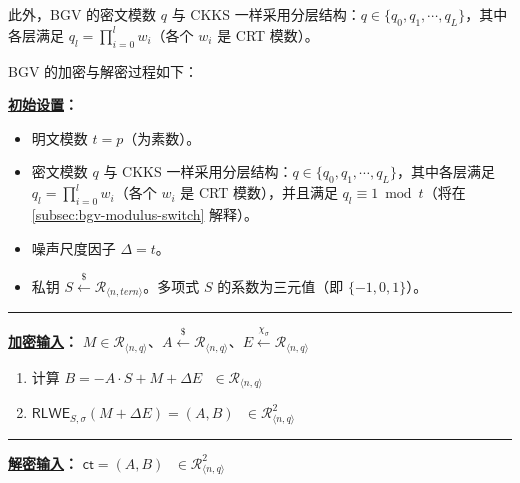 此外，BGV 的密文模数 $q$ 与 CKKS 一样采用分层结构：$q \in \{q_0, q_1, \cdots, q_L\}$，其中各层满足 $q_l = \prod\limits_{i=0}^l w_i$（各个 $w_i$ 是 CRT 模数）。

BGV 的加密与解密过程如下：


\begin{tcolorbox}[title={\textbf{\tboxlabel{\ref*{subsec:bgv-enc-dec}} BGV 加密与解密}}]

\textbf{\underline{初始设置}：}

\begin{itemize}
\item 明文模数 $t = p$（为素数）。

\item 密文模数 $q$ 与 CKKS 一样采用分层结构：$q \in \{q_0, q_1, \cdots, q_L\}$，其中各层满足 $q_l = \prod\limits_{i=0}^l w_i$（各个 $w_i$ 是 CRT 模数），并且满足 $q_l \equiv 1 \bmod t$（将在 \autoref{subsec:bgv-modulus-switch} 解释）。

\item 噪声尺度因子 $\Delta=t$。
\item 私钥 $S \xleftarrow{\$} \mathcal{R}_{\langle n, \textit{tern} \rangle}$。多项式 $S$ 的系数为三元值（即 $\{-1, 0, 1\}$）。

\end{itemize}

\par\noindent\rule{\textwidth}{0.4pt}

\textbf{\underline{加密输入}：} $M \in \mathcal{R}_{\langle n, q \rangle}$、$A \xleftarrow{\$} \mathcal{R}_{\langle n, q \rangle}$、$E \xleftarrow{\chi_\sigma} \mathcal{R}_{\langle n, q \rangle}$


\begin{enumerate}

\item 计算 $B = -A \cdot S + M + \Delta E \text{ } \in \mathcal{R}_{\langle n,q \rangle}$

\item $\textsf{RLWE}_{S,\sigma}(M + \Delta E) = (A, B) \text{ } \in \mathcal{R}_{\langle n,q \rangle}^2$

\end{enumerate}

\par\noindent\rule{\textwidth}{0.4pt}

\textbf{\underline{解密输入}：} $\textsf{ct} = (A, B) \text{ } \in \mathcal{R}_{\langle n,q \rangle}^2$


\end{tcolorbox}
